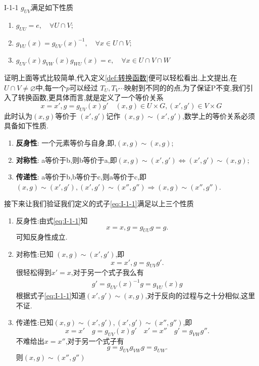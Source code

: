 \documentclass[../main.tex]{subfiles}
\begin{document}
 \begin{theorem}
 {}{I-1-1}
 $g_{UV}$满足如下性质
  \begin{enumerate}
    \item $g_{U U} = e, \quad \forall U\cap V ;$
    \item $g_{VU}(x) = g_{UV}(x)^{-1} , \quad \forall x \in U\cap V;$
    \item $g_{UV}(x) g_{VW}(x) g_{WU}(x) = e,\quad \forall x \in U\cap V\cap W$
 \end{enumerate}
 \end{theorem}
 证明上面等式比较简单,代入定义\ref{def:转换函数}便可以轻松看出.上文提出,在$U\cap V \neq \varnothing$中,每一个$p$可以经过
$T_U,T_V \cdots$映射到不同的的点,为了保证P不变,我们引入了转换函数,更具体而言,就是定义了一个等价关系
\begin{equation}
  x = x' , g = g_{UV}(x)g' \quad (x,g) \in  U\times G , (x',g') \in  V\times G
  \label{eq:I-1-1} 
\end{equation}
此时认为$(x,g)$等价于 $(x',g')$记作 $(x,g) \sim (x',g')$,数学上的等价关系必须具备如下性质.
\begin{enumerate}
  \item \textbf{反身性}: 一个元素等价与自身,即,$(x,g) \sim (x,g)$;
  \item \textbf{对称性}: a等价于b,则b等价于a,即$(x,g) \sim (x',g') \Leftrightarrow (x',g') \sim (x,g)$;
  \item \textbf{传递性}: a等价于b,b等价于c,则a等价于c,即$(x,g)\sim (x',g'),(x',g') \sim (x'',g'') \Rightarrow (x,g) \sim (x'',g'')$.
\end{enumerate}
接下来让我们验证我们定义的式子\ref{eq:I-1-1}满足以上三个性质
\begin{enumerate}
  \item 反身性:由式\ref{eq:I-1-1}知 \[
      x = x,g = g_{U U}g = g
  .\] 可知反身性成立.
\item 对称性:已知 $(x,g) \sim (x',g')$,即\[
    x = x' ,g = g_{UV} g'
.\]很轻松得到$x' = x$,对于另一个式子我么有
\begin{align*}
  g' = g_{UV}(x)^{-1}g = g_{VU}(x)g
\end{align*}
根据式子\ref{eq:I-1-1}知道$(x',g') \sim (x,g)$,对于反向的过程与之十分相似,这里不证.
 \item 传递性:已知$(x,g)\sim (x',g'),(x',g') \sim (x'',g'')$,即\[
   x = x' \quad g = g_{UV}(x)g'\quad x' = x'' \quad g ' = g_{VW}g''
 .\]
 不难给出$x = x''$,对于另一个式子有 \[
 g = g_{UV}g_{VW} g= g_{UW} 
 .\] 则$(x,g) \sim (x'',g'')$
\end{enumerate}
\end{document}
